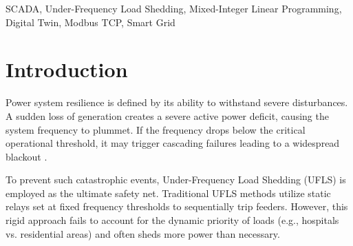 \documentclass[conference]{IEEEtran}
\begin{document}
\begin{abstract}
The stability of a power grid heavily relies on the delicate balance between generation and load demand. When a major contingency occurs, such as a generator trip, the system frequency drops rapidly, threatening a complete blackout. Conventional Under-Frequency Load Shedding (UFLS) schemes often rely on static, pre-determined shedding thresholds which can lead to over-shedding or under-shedding. This paper proposes a dynamic, optimal UFLS and recovery scheme integrated within a Supervisory Control and Data Acquisition (SCADA) system. A Digital Twin of the electrical grid was developed using Python to model the swing equation and governor droop control in real-time. A Mixed-Integer Linear Programming (MILP) algorithm was formulated to minimize load shedding penalties by dynamically selecting non-critical loads based on real-time network deficits. The control logic was bridged through a Virtual Programmable Logic Controller (PLC) via Modbus TCP/IP. Furthermore, a highly interactive Web Human-Machine Interface (HMI) was deployed to provide real-time transient visualization and contingency matrices. Simulation results demonstrate that the proposed MILP-based SCADA system successfully arrests frequency decline and restores the system to a nominal 50.0 Hz with minimal economic disruption.
\end{abstract}

\begin{IEEEkeywords}
SCADA, Under-Frequency Load Shedding, Mixed-Integer Linear Programming, Digital Twin, Modbus TCP, Smart Grid
\end{IEEEkeywords}

\section{Introduction}
Power system resilience is defined by its ability to withstand severe disturbances. A sudden loss of generation creates a severe active power deficit, causing the system frequency to plummet. If the frequency drops below the critical operational threshold, it may trigger cascading failures leading to a widespread blackout \cite{intro1}. 

To prevent such catastrophic events, Under-Frequency Load Shedding (UFLS) is employed as the ultimate safety net. Traditional UFLS methods utilize static relays set at fixed frequency thresholds to sequentially trip feeders. However, this rigid approach fails to account for the dynamic priority of loads (e.g., hospitals vs. residential areas) and often sheds more power than necessary. 
\end{document}
